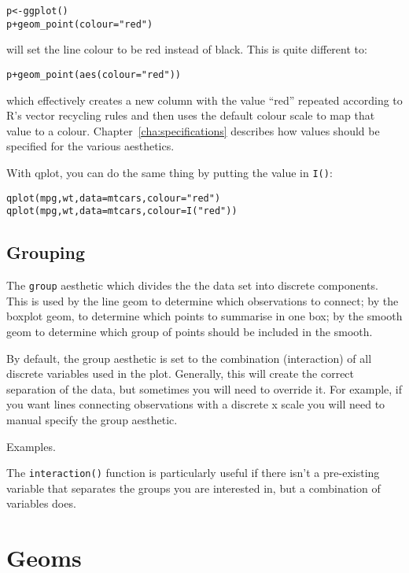 \begin{alltt}
p <- ggplot()
p + geom_point(colour="red")  
\end{alltt}

\noindent will set the line colour to be red instead of black.  This is quite different to:

\begin{alltt}
p + geom_point(aes(colour="red"))
\end{alltt}

\noindent which effectively creates a new column with the value ``red'' repeated according to R's vector recycling rules and then uses the default colour scale to map that value to a colour. Chapter~\ref{cha:specifications} describes how values should be specified for the various aesthetics.  

With qplot, you can do the same thing by putting the value in {\tt I()}:

\begin{alltt}
  qplot(mpg, wt, data=mtcars, colour = "red")
  qplot(mpg, wt, data=mtcars, colour = I("red"))
\end{alltt}


\subsection{Grouping}
\label{sub:grouping}

The {\tt group} aesthetic which divides the the data set into discrete components.   This is used by the line geom to determine which observations to connect; by the boxplot geom, to determine which points to summarise in one box; by the smooth geom to determine which group of points should be included in the smooth.

By default, the group aesthetic is set to the combination (interaction) of all discrete variables used in the plot.  Generally, this will create the correct separation of the data, but sometimes you will need to override it.  For example, if you want lines connecting observations with a discrete x scale you will need to manual specify the group aesthetic.  


% 
% 
Examples.



The {\tt interaction()} function is particularly useful if there isn't a pre-existing variable that separates the groups you are interested in, but a combination of variables does.  

\section{Geoms}
\label{sec:geom}


